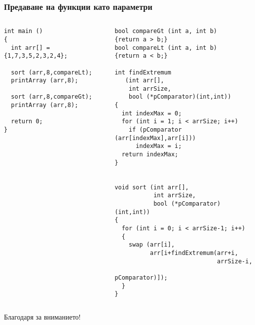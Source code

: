 \documentclass{beamer}
\begin{document}
\begin{frame}[fragile]
\frametitle{Предаване на функции като параметри}



\vspace{-20px}

\begin{columns}[t]
  \begin{column}{0.5\textwidth}
\begin{flushleft}
\begin{lstlisting}
int main ()
{
  int arr[] = {1,7,3,5,2,3,2,4};

  sort (arr,8,compareLt);
  printArray (arr,8);

  sort (arr,8,compareGt);
  printArray (arr,8);

  return 0;
}
\end{lstlisting}  
\end{flushleft}
  \end{column}
  \begin{column}{0.5\textwidth}
\begin{flushleft}
\begin{lstlisting}
bool compareGt (int a, int b)
{return a > b;}
bool compareLt (int a, int b)
{return a < b;}

int findExtremum 
   (int arr[], 
    int arrSize, 
    bool (*pComparator)(int,int))
{
  int indexMax = 0;
  for (int i = 1; i < arrSize; i++)
    if (pComparator (arr[indexMax],arr[i]))
      indexMax = i;
  return indexMax;
}


void sort (int arr[], 
           int arrSize,
           bool (*pComparator)(int,int))
{
  for (int i = 0; i < arrSize-1; i++)
  {
    swap (arr[i],
          arr[i+findExtremum(arr+i,
                             arrSize-i,
                             pComparator)]);
  }
}
\end{lstlisting}  
\end{flushleft}
  \end{column}
\end{columns}


\end{frame}




\begin{frame}
\centerline{Благодаря за вниманието!}
\end{frame}
\end{document}
